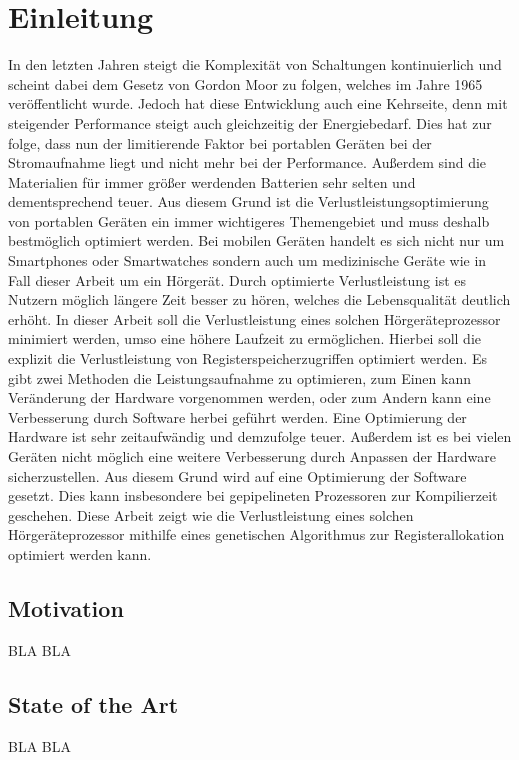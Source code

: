
\thispagestyle{empty}
%
\chapter{Einleitung}
\label{chap:introduction}
In den letzten Jahren steigt die Komplexität von Schaltungen kontinuierlich und scheint dabei dem Gesetz von Gordon Moor zu folgen, welches im Jahre 1965 veröffentlicht wurde. Jedoch hat diese Entwicklung auch eine Kehrseite, denn mit steigender Performance steigt auch gleichzeitig der Energiebedarf. Dies hat zur folge, dass nun der limitierende Faktor bei portablen Geräten bei der Stromaufnahme liegt und nicht mehr bei der Performance. Außerdem sind die Materialien für immer größer werdenden Batterien sehr selten und dementsprechend teuer. Aus diesem Grund ist die Verlustleistungsoptimierung von portablen Geräten ein immer wichtigeres Themengebiet und muss deshalb bestmöglich optimiert werden. Bei mobilen Geräten handelt es sich nicht nur um Smartphones oder Smartwatches sondern auch um medizinische Geräte wie in Fall dieser Arbeit um ein Hörgerät. Durch optimierte Verlustleistung ist es Nutzern möglich längere Zeit besser zu hören, welches die Lebensqualität deutlich erhöht.
In dieser Arbeit soll die Verlustleistung eines solchen Hörgeräteprozessor minimiert werden, umso eine höhere Laufzeit zu ermöglichen. Hierbei soll die explizit die Verlustleistung von Registerspeicherzugriffen optimiert werden. 
Es gibt zwei Methoden die Leistungsaufnahme zu optimieren, zum Einen kann Veränderung der Hardware vorgenommen werden, oder zum Andern kann eine Verbesserung durch Software herbei geführt werden. Eine Optimierung der Hardware ist sehr zeitaufwändig und demzufolge teuer. Außerdem ist es bei vielen Geräten nicht möglich eine weitere Verbesserung durch Anpassen der Hardware sicherzustellen. Aus diesem Grund wird auf eine Optimierung der Software gesetzt. Dies kann insbesondere bei gepipelineten Prozessoren zur Kompilierzeit geschehen. 
Diese Arbeit zeigt wie die Verlustleistung eines solchen Hörgeräteprozessor mithilfe eines genetischen Algorithmus zur Registerallokation optimiert werden kann.

\section{Motivation}
\label{sec:motivation}
BLA BLA

\section{State of the Art}
\label{sec:objectives}
BLA BLA

